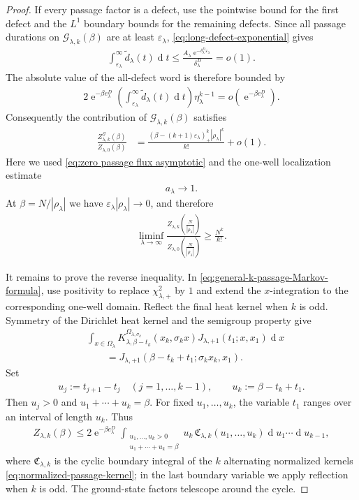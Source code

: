 \documentclass[a4paper,10pt]{article}
\numberwithin{equation}{section}
\theoremstyle{plain}
\theoremstyle{plain}
\theoremstyle{plain}
\theoremstyle{plain}
\theoremstyle{plain}
\theoremstyle{remark}
\theoremstyle{definition}
\newcommand{\ee}{\operatorname{e}}
\newcommand{\dif}{\operatorname{d}\!} %
\newcommand{\abs}[1]{\left\lvert#1\right\rvert}
\newcommand{\eq}[1]{\begin{align*}#1\end{align*}}
\newcommand{\eql}[1]{\begin{align}#1\end{align}}
\newcommand{\br}[1]{\left(#1\right)}
\begin{document}
\begin{proof}
If every passage factor is a defect, use the pointwise bound for the first defect and the $L^1$ boundary bounds for the remaining defects. Since all passage durations on $\mathcal G_{\lambda,k}(\beta)$ are at least $\varepsilon_\lambda$, \cref{eq:long-defect-exponential} gives
\eq{
\int_{\varepsilon_\lambda}^{\infty}
\widetilde d_\lambda(t)\dif{t}
\leq
\frac{A_\lambda\ee^{-\delta_\lambda^D\varepsilon_\lambda}}{\delta_\lambda^D}
=o(1).
}
The absolute value of the all-defect word is therefore bounded by
\eq{
2\ee^{-\beta e_\lambda^D}
\left(
\int_{\varepsilon_\lambda}^{\infty}
\widetilde d_\lambda(t)\dif{t}
\right)
\eta_\lambda^{k-1}
=
o\br{\ee^{-\beta e_\lambda^D}}.
}
Consequently the contribution of $\mathcal G_{\lambda,k}(\beta)$ satisfies
\begin{align}
\frac{Z_{\lambda,k}^{\mathcal G}(\beta)}{Z_{\lambda,0}(\beta)}
&=
\frac{\br{\beta-(k+1)\varepsilon_\lambda}_+^k\abs{\rho_\lambda}^k}{k!}
+o(1).
\label{eq:separated-lower-asymptotic}
\end{align}
Here we used \cref{eq:zero passage flux asymptotic} and the one-well localization estimate
\eql{
a_\lambda\longrightarrow1.
\label{eq:a-lambda-to-one}
}
At $\beta=N/\abs{\rho_\lambda}$ we have $\varepsilon_\lambda\abs{\rho_\lambda}\to0$, and therefore
\eql{
\liminf_{\lambda\to\infty}
\frac{Z_{\lambda,k}\br{\frac{N}{\abs{\rho_\lambda}}}}{Z_{\lambda,0}\br{\frac{N}{\abs{\rho_\lambda}}}}
\geq
\frac{N^k}{k!}.
\label{eq:fixed-k-liminf}
}

It remains to prove the reverse inequality. In \cref{eq:general-k-passage-Markov-formula}, use positivity to replace $\chi_{\lambda,+}^2$ by $1$ and extend the $x$-integration to the corresponding one-well domain. Reflect the final heat kernel when $k$ is odd. Symmetry of the Dirichlet heat kernel and the semigroup property give
\begin{align}
&\int_{x\in\Omega_\lambda}
K_{\lambda,\beta-t_k}^{\Omega_{\lambda,\sigma_k}}
\br{x_k,\sigma_kx}
J_{\lambda,+1}(t_1;x,x_1)
\dif{x}
\nonumber\\
&\qquad=
J_{\lambda,+1}
\br{\beta-t_k+t_1;\sigma_kx_k,x_1}.
\label{eq:cyclic-gluing-identity}
\end{align}
Set
\eq{
u_j:=t_{j+1}-t_j
\quad(j=1,\ldots,k-1),
\qquad
u_k:=\beta-t_k+t_1.
}
Then $u_j>0$ and $u_1+\cdots+u_k=\beta$. For fixed $u_1,\ldots,u_k$, the variable $t_1$ ranges over an interval of length $u_k$. Thus
\eql{
Z_{\lambda,k}(\beta)
\leq
2\ee^{-\beta e_\lambda^D}
\int_{\substack{
u_1,\ldots,u_k>0\\
u_1+\cdots+u_k=\beta
}}
u_k\,
\mathfrak C_{\lambda,k}(u_1,\ldots,u_k)
\dif{u_1}\cdots\dif{u_{k-1}},
\label{eq:cyclic-upper-bound}
}
where $\mathfrak C_{\lambda,k}$ is the cyclic boundary integral of the $k$ alternating normalized kernels \cref{eq:normalized-passage-kernel}; in the last boundary variable we apply reflection when $k$ is odd. The ground-state factors telescope around the cycle.


\end{proof}
\end{document}
